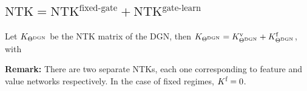 \subsection{$\text{NTK}=\text{NTK}^{\text{fixed-gate}}+\text{NTK}^{\text{gate-learn}}$}
\begin{proposition}\label{prop:ntks} Let $K_{\Theta^{\text{DGN}}}$ be the NTK matrix of the DGN, then $K_{\Theta^{\text{DGN}}}=K^{\text{v}}_{\Theta^{\text{DGN}}}+K^{\text{f}}_{\Theta^{\text{DGN}}}$, with
\end{proposition}
\textbf{Remark:} There are two separate NTKs, each one corresponding to feature and value networks respectively. In the case of fixed regimes, $K^{\text{f}}=0$. 
